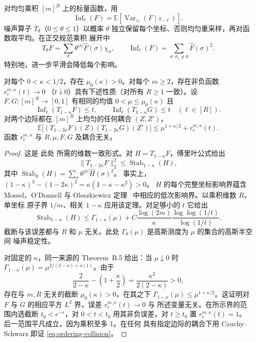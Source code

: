 对均匀乘积 \([m]^R\) 上的标量函数，用
\[
 \operatorname{Inf}_\ell(F)
 =\mathbb E\!\left[\operatorname{Var}_{z_\ell}
       (F\mid z_{-\ell})\right].
\]
噪声算子 \(T_\theta\)（\(0\le\theta\le1\)）以概率 \(\theta\)
独立保留每个坐标、否则均匀重采样，再对函数取平均。在正交规范乘积
展开中
\begin{equation}
 T_\theta F=\sum_\sigma\theta^{|\sigma|}\widehat F(\sigma)\chi_\sigma,
 \qquad
 \operatorname{Inf}_\ell(F)
 =\sum_{\sigma:\sigma_\ell\ne0}\widehat F(\sigma)^2.
\label{eq:ordering-noise-influence}
\end{equation}
特别地，进一步平滑会降低每个影响。

\begin{lemma}[均匀碰撞估计]\label{lem:ordering-collision}
对每个 \(0<\kappa<1/2\)，存在 \(\mu_0(\kappa)>0\)。对每个
\(m\ge2\)，存在非负函数 \(r_c^{m,\kappa}(t)\to0\)
（\(t\downarrow0\)）具有下述性质（对所有 \(R\ge1\) 一致）。设
\(F,G:[m]^R\to[0,1]\) 有相同的均值 \(0<\mu\le\mu_0(\kappa)\) 且
\[
 \operatorname{Inf}_\ell(T_{1-\kappa}F)\le t,\qquad
 \operatorname{Inf}_\ell(T_{1-\kappa}G)\le t
 \quad(\ell\in[R]).
\]
对两个边际都在 \([m]^R\) 上均匀的任何耦合 \((Z,Z')\)，
\begin{equation}
 \mathbb E\bigl[
   (T_{1-2\kappa}F)(Z)(T_{1-2\kappa}G)(Z')\bigr]
 \le \mu^{1+\kappa/2}+r_c^{m,\kappa}(t).
\label{eq:ordering-collision}
\end{equation}
函数 \(r_c^{m,\kappa}\) 与 \(R,\mu,F,G\) 及耦合无关。
\end{lemma}

\begin{proof}
这是 \cite[Lemmas~3.4 and~3.5]{GuruswamiEtAl2011OrderingCSP} 此处
所需的维数一致形式。对 \(H=T_{1-\kappa}F\)，傅里叶公式给出
\[
 \|T_{1-2\kappa}F\|_2^2
 \le \operatorname{Stab}_{1-\kappa}(H),
\]
其中 \(\operatorname{Stab}_\theta(H)
=\sum_\sigma\theta^{|\sigma|}\widehat H(\sigma)^2\)。
事实上，
\((1-\kappa)^3-(1-2\kappa)^2
=\kappa(1-\kappa-\kappa^2)>0\)。
\(H\) 的每个完整坐标影响界蕴含 Mossel、O'Donnell 与 Oleszkiewicz
定理~\cite{MOO10} 中相应的低次影响界。以乘积维数 \(R\)、单坐标
原子界 \(1/m\)、相关 \(1-\kappa\) 应用该定理。对足够小的 \(t\)
它给出
\[
 \operatorname{Stab}_{1-\kappa}(H)
 \le \Gamma_{1-\kappa}(\mu)
 +C\frac{\log(2m)}{\kappa}
       \frac{\log\log(1/t)}{\log(1/t)}.
\]
截断与该误差都与 \(R\) 和 \(\mu\) 无关。此处
\(\Gamma_\theta(\mu)\) 是高斯测度为 \(\mu\) 的集合的高斯半空间
噪声稳定性。

对固定的 \(\kappa\)，同一来源的 Theorem~B.5 给出：当
\(\mu\downarrow0\) 时
\(\Gamma_{1-\kappa}(\mu)=\mu^{2/(2-\kappa)+o(1)}\)。由于
\[
 \frac{2}{2-\kappa}-\left(1+\frac{\kappa}{2}\right)
 =\frac{\kappa^2}{2(2-\kappa)}>0,
\]
存在与 \(m,R\) 无关的截断 \(\mu_0(\kappa)>0\)，在其之下
\(\Gamma_{1-\kappa}(\mu)\le\mu^{1+\kappa/2}\)。这证明对 \(F\) 与
\(G\) 的相应平方 \(L^2\) 界，误差 \(r_c^{m,\kappa}(t)\to0\) 与
所述变量无关。在所示界的范围内选截断 \(t_0<e^{-e}\)，对
\(0<t<t_0\) 用其非负误差，对 \(t\ge t_0\) 置
\(r_c^{m,\kappa}(t)=1\)。后一范围平凡成立，因为乘积至多 1。在任何
具有指定边际的耦合下用 Cauchy--Schwarz 即证
\eqref{eq:ordering-collision}。
\end{proof}

